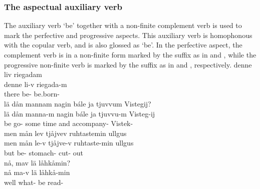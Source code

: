 \subsubsection{The aspectual auxiliary verb }\label{auxV}
The auxiliary verb  ‘be’ %
together with a non-finite complement verb is used to mark the perfective and progressive aspects. This auxiliary verb is homophonous with the copular verb, and is also glossed as ‘be’.
In the perfective aspect, the complement verb is in a non-finite form marked by the suffix  as in  and , while the progressive non-finite verb is marked by the suffix  %
as in  and , respectively.
\ea\label{perfClause1}%
\glll	denne liv riegadam\\
	denne li-v riegada-m\\
	there be- be.born-\\\nopagebreak
{} 
\z
\ea\label{perfClause2}%
\glll	lä dån mannam nagin bále ja tjuvvum Vistegij?\\
	lä dån manna-m nagin bále ja tjuvvu-m Visteg-ij\\
	be\BS{}  go- some time\BS{} and accompany- Vistek-\\\nopagebreak
{} 
\z
\ea\label{progClause1}%
\glll	men mån lev tjåjvev ruhtastemin ullgus\\
	men mån le-v tjåjve-v ruhtaste-min ullgus\\
	but  be- stomach- cut- out\\\nopagebreak
{} 
\z
\ea\label{progClause2}
\glll	nå, mav lä låhkåmin?\\
	nå ma-v lä låhkå-min\\
	well what- be\BS{} read-\\\nopagebreak
{} 
\z
{}


